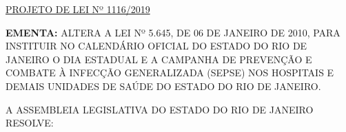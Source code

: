 \documentclass[10pt]{article}
\date{}
\begin{document}
\maketitle
\begin{center}
  \huge
  \vspace{-3cm}\href{http://alerjln1.alerj.rj.gov.br/scpro1923.nsf/f4b46b3cdbba990083256cc900746cf6/48d90fd585ae2a638325843b00637364?OpenDocument}{PROJETO DE LEI Nº 1116/2019}
\bigskip
\bigskip
\bigskip
  
\end{center}

\textbf{EMENTA:} 
ALTERA A LEI Nº 5.645, DE 06 DE JANEIRO DE 2010, PARA INSTITUIR NO CALENDÁRIO OFICIAL DO ESTADO DO RIO DE JANEIRO  O DIA ESTADUAL E A CAMPANHA DE PREVENÇÃO E COMBATE À INFECÇÃO GENERALIZADA (SEPSE) NOS HOSPITAIS E DEMAIS UNIDADES DE SAÚDE DO ESTADO DO RIO DE JANEIRO.








\bigskip

\noindent
A ASSEMBLEIA LEGISLATIVA DO ESTADO DO RIO DE JANEIRO RESOLVE:
\end{document}
